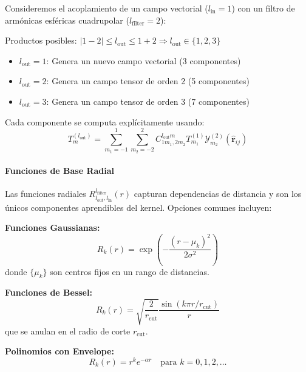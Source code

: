 \begin{example}\label{ex:tfn_tensor_product}
Consideremos el acoplamiento de un campo vectorial ($l_{\text{in}} = 1$) con un filtro de armónicas esféricas cuadrupolar ($l_{\text{filter}} = 2$):

Productos posibles: $|1 - 2| \leq l_{\text{out}} \leq 1 + 2 \Rightarrow l_{\text{out}} \in \{1, 2, 3\}$

\begin{itemize}
    \item $l_{\text{out}} = 1$: Genera un nuevo campo vectorial (3 componentes)
    \item $l_{\text{out}} = 2$: Genera un campo tensor de orden 2 (5 componentes)
    \item $l_{\text{out}} = 3$: Genera un campo tensor de orden 3 (7 componentes)
\end{itemize}

Cada componente se computa explícitamente usando:
\begin{equation}
T^{(l_{\text{out}})}_m = \sum_{m_1=-1}^{1} \sum_{m_2=-2}^{2} C_{1 m_1, 2 m_2}^{l_{\text{out}} m} T^{(1)}_{m_1} \mathcal{Y}^{(2)}_{m_2}(\hat{\mathbf{r}}_{ij})
\end{equation}
\end{example}

\paragraph{Funciones de Base Radial}

Las funciones radiales $R^{l_{\text{filter}}}_{l_{\text{out}}, l_{\text{in}}}(r)$ capturan dependencias de distancia y son los únicos componentes aprendibles del kernel. Opciones comunes incluyen:

\textbf{Funciones Gaussianas:}
\begin{equation}
R_k(r) = \exp\left(-\frac{(r - \mu_k)^2}{2\sigma^2}\right)
\end{equation}
donde $\{\mu_k\}$ son centros fijos en un rango de distancias.

\textbf{Funciones de Bessel:}
\begin{equation}
R_k(r) = \sqrt{\frac{2}{r_{\text{cut}}}} \frac{\sin(k\pi r / r_{\text{cut}})}{r}
\end{equation}
que se anulan en el radio de corte $r_{\text{cut}}$.

\textbf{Polinomios con Envelope:}
\begin{equation}
R_k(r) = r^k e^{-\alpha r} \quad \text{para } k = 0, 1, 2, \ldots
\end{equation}

